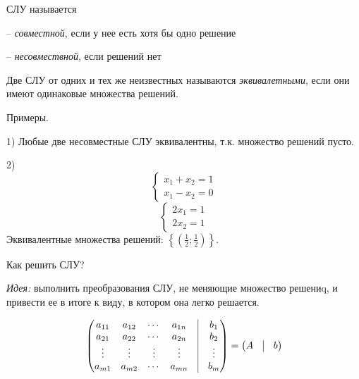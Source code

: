 \begin{definition}
    СЛУ называется 

    -- \textit{совместной}, если у нее есть хотя бы одно решение

    -- \textit{несовмествной}, если решений нет
\end{definition}

\begin{definition}
    Две СЛУ от одних и тех же неизвестных называются \textit{эквивалетными}, если они имеют одинаковые множества решений.
\end{definition}

\bigskip
Примеры.

1) Любые две несовместные СЛУ эквивалентны, т.к. множество решений пусто.

2) 
\begin{equation*}
	\left\{
		\begin{aligned}
        x_1 + x_2 = 1 \\
        x_1 - x_2 = 0
		\end{aligned}
	\right. 
\end{equation*}
\begin{equation*}
    \left\{
		\begin{aligned}
        2x_1 = 1 \\
        2x_2 = 1
		\end{aligned}
	\right.
\end{equation*}
Эквивалентные множества решений: $ \left\{ \left( \frac{1}{2} ; \frac{1}{2} \right) \right\}$.

\bigskip
Как решить СЛУ?

\textit{Идея:} выполнить преобразования СЛУ, не меняющие множество решениq, и привести ее в итоге к виду, в котором она легко решается.

\begin{equation*}
	\begin{pmatrix}
		a_{11} & a_{12} & \cdots & a_{1n} & \vrule & b_1 \\
		a_{21} & a_{22} & \cdots & a_{2n} & \vrule & b_2 \\
       \vdots & \vdots & \vdots& \vdots & \vrule & \vdots\\ 
       a_{m1} & a_{m2} & \cdots & a_{mn} & \vrule & b_m
	\end{pmatrix}
    =
    \begin{pmatrix}
    	A & \vrule & b
	\end{pmatrix}
\end{equation*}

